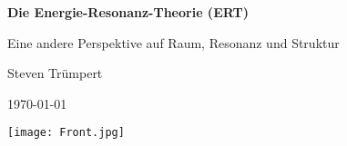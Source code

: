 \documentclass[12pt, a4paper, oneside, openany,DIV=16 headings=small]{scrbook}
\begin{document}
\begin{titlepage}
    \thispagestyle{empty}
    \centering
    {\LARGE\bfseries Die Energie-Resonanz-Theorie (ERT)\par}
     \vspace{0.3cm}
    {\large Eine andere Perspektive auf Raum, Resonanz und Struktur\par} 
    \vspace{1.2cm}
    {\Large Steven Trümpert\par}
    \vspace{0.6cm}
    {\large \today\par}
    \vspace{3.0cm}
    \texttt{[image: Front.jpg]}
    \vfill
\end{titlepage}

\begin{abstract}

\end{abstract}
\tableofcontents

\mainmatter











\appendix

\glsaddall
\printglossaries
\nocite{*}
\printbibliography
\end{document}
